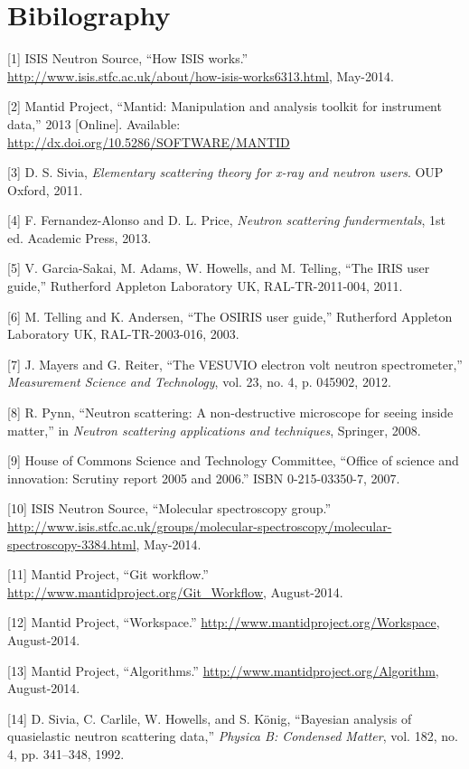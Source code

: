 \documentclass[paper=a4, fontsize=11pt]{scrartcl}	%
\numberwithin{equation}{section}															%
\numberwithin{figure}{section}																%
\numberwithin{table}{section}
\begin{document}
\clearpage
\section*{Bibilography}\label{bibilography}

{[}1{]} ISIS Neutron Source, ``How ISIS works.''
\url{http://www.isis.stfc.ac.uk/about/how-isis-works6313.html},
May-2014.

{[}2{]} Mantid Project, ``Mantid: Manipulation and analysis toolkit for
instrument data,'' 2013 {[}Online{]}. Available:
\url{http://dx.doi.org/10.5286/SOFTWARE/MANTID}

{[}3{]} D. S. Sivia, \emph{Elementary scattering theory for x-ray and
neutron users}. OUP Oxford, 2011.

{[}4{]} F. Fernandez-Alonso and D. L. Price, \emph{Neutron scattering
fundermentals}, 1st ed. Academic Press, 2013.

{[}5{]} V. Garcia-Sakai, M. Adams, W. Howells, and M. Telling, ``The
IRIS user guide,'' Rutherford Appleton Laboratory UK, RAL-TR-2011-004,
2011.

{[}6{]} M. Telling and K. Andersen, ``The OSIRIS user guide,''
Rutherford Appleton Laboratory UK, RAL-TR-2003-016, 2003.

{[}7{]} J. Mayers and G. Reiter, ``The VESUVIO electron volt neutron
spectrometer,'' \emph{Measurement Science and Technology}, vol. 23, no.
4, p. 045902, 2012.

{[}8{]} R. Pynn, ``Neutron scattering: A non-destructive microscope for
seeing inside matter,'' in \emph{Neutron scattering applications and
techniques}, Springer, 2008.

{[}9{]} House of Commons Science and Technology Committee, ``Office of
science and innovation: Scrutiny report 2005 and 2006.'' ISBN
0-215-03350-7, 2007.

{[}10{]} ISIS Neutron Source, ``Molecular spectroscopy group.''
\url{http://www.isis.stfc.ac.uk/groups/molecular-spectroscopy/molecular-spectroscopy-3384.html},
May-2014.

{[}11{]} Mantid Project, ``Git workflow.''
\url{http://www.mantidproject.org/Git_Workflow}, August-2014.

{[}12{]} Mantid Project, ``Workspace.''
\url{http://www.mantidproject.org/Workspace}, August-2014.

{[}13{]} Mantid Project, ``Algorithms.''
\url{http://www.mantidproject.org/Algorithm}, August-2014.

{[}14{]} D. Sivia, C. Carlile, W. Howells, and S. K{ö}nig, ``Bayesian
analysis of quasielastic neutron scattering data,'' \emph{Physica B:
Condensed Matter}, vol. 182, no. 4, pp. 341--348, 1992.
\end{document}
